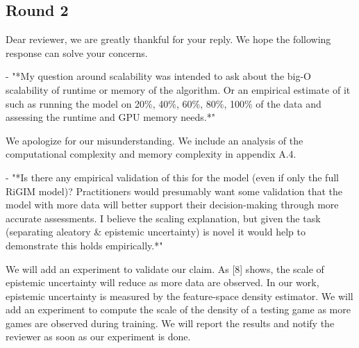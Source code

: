 \documentclass{article}
\begin{document}
\begin{itemize}
\subsection{Round 2}

Dear reviewer, we are greatly thankful for your reply. We hope the following response can solve your concerns.

- "*My question around scalability was intended to ask about the big-O scalability of runtime or memory of the algorithm. Or an empirical estimate of it such as running the model on 20\%, 40\%, 60\%, 80\%, 100\% of the data and assessing the runtime and GPU memory needs.*"

We apologize for our misunderstanding. We include an analysis of the computational complexity and memory complexity in appendix A.4.

- "*Is there any empirical validation of this for the model (even if only the full RiGIM model)? Practitioners would presumably want some validation that the model with more data will better support their decision-making through more accurate assessments. I believe the scaling explanation, but given the task (separating aleatory & epistemic uncertainty) is novel it would help to demonstrate this holds empirically.*"

We will add an experiment to validate our claim. As [8] shows, the scale of epistemic uncertainty will reduce as more data are observed. In our work, epistemic uncertainty is measured by the feature-space density estimator. We will add an experiment to compute the scale of the density of a testing game as more games are observed during training. We will report the results and notify the reviewer as soon as our experiment is done.  
\end{itemize}
\end{document}
